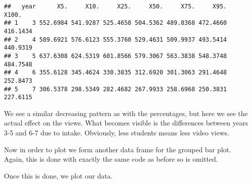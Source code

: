 \documentclass[
]{article}
\newenvironment{Shaded}{\begin{snugshade}}{\end{snugshade}}
\newcommand{\DataTypeTok}[1]{\textcolor[rgb]{0.13,0.29,0.53}{#1}}
\newcommand{\DecValTok}[1]{\textcolor[rgb]{0.00,0.00,0.81}{#1}}
\newcommand{\KeywordTok}[1]{\textcolor[rgb]{0.13,0.29,0.53}{\textbf{#1}}}
\newcommand{\NormalTok}[1]{#1}
\newcommand{\OperatorTok}[1]{\textcolor[rgb]{0.81,0.36,0.00}{\textbf{#1}}}
\newcommand{\StringTok}[1]{\textcolor[rgb]{0.31,0.60,0.02}{#1}}
\begin{document}
\begin{Shaded}
\end{Shaded}

\begin{verbatim}
##   year      X5.     X10.     X25.     X50.     X75.     X95.    X100.
## 1    3 552.6984 541.9287 525.4658 504.5362 489.8368 472.4660 416.1434
## 2    4 589.6921 576.6123 555.3760 529.4631 509.9937 493.5414 440.9319
## 3    5 637.6308 624.5319 601.8566 579.3067 563.3838 548.3748 484.7548
## 4    6 355.6128 345.4624 330.3835 312.6920 301.3063 291.4648 252.8473
## 5    7 306.5378 298.5349 282.4682 267.9933 258.6968 250.3831 227.6115
\end{verbatim}

We see a similar decreasing pattern as with the percentages, but here we
see the actual effect on the views. What becomes visible is the
differences between years 3-5 and 6-7 due to intake. Obviously, less
students means less video views.

Now in order to plot we form another data frame for the grouped bar
plot. Again, this is done with exactly the same code as before so is
omitted.

Once this is done, we plot our data.

\begin{Shaded}
\end{Shaded}
\end{document}
